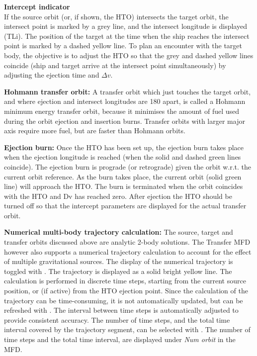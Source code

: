 \documentclass[Orbiter User Manual.tex]{subfiles}
\begin{document}
\textbf{Intercept indicator}\\
If the source orbit (or, if shown, the HTO) intersects the target orbit, the
intersect point is marked by a grey line, and the intersect longitude is
displayed (TLi). The position of the target at the time when the ship reaches
the intersect point is marked by a dashed yellow line. To plan an encounter with
the target body, the objective is to adjust the HTO so that the grey and dashed
yellow lines coincide (ship and target arrive at the intersect point
simultaneously) by adjusting the ejection time and $\Delta v$.

\textbf{Hohmann transfer orbit:}
A transfer orbit which just touches the target orbit, and where ejection and
intersect longitudes are 180\deg{} apart, is called a Hohmann minimum energy
transfer orbit, because it minimises the amount of fuel used during the orbit
ejection and insertion burns. Transfer orbits with larger major axis require
more fuel, but are faster than Hohmann orbits.

\textbf{Ejection burn:}
Once the HTO has been set up, the ejection burn takes place when the ejection
longitude is reached (when the solid and dashed green lines coincide). The
ejection burn is prograde (or retrograde) given the orbit w.r.t. the current
orbit reference. As the burn takes place, the current orbit (solid green line)
will approach the HTO. The burn is terminated when the orbit coincides with the
HTO and Dv has reached zero. After ejection the HTO should be turned off so that
the intercept parameters are displayed for the actual transfer orbit.

\textbf{Numerical multi-body trajectory calculation:}
The source, target and transfer orbits discussed above are analytic 2-body
solutions. The Transfer MFD however also supports a numerical trajectory
calculation to account for the effect of multiple gravitational sources. The
display of the numerical trajectory is toggled with . The trajectory
is displayed as a solid bright yellow line. The calculation is performed in
discrete time steps, starting from the current source position, or (if active)
from the HTO ejection point. Since the calculation of the trajectory can be
time-consuming, it is not automatically updated, but can be refreshed with
. The interval between time steps is automatically adjusted to provide
consistent accuracy. The number of time steps, and the total time interval
covered by the trajectory segment, can be selected with . The number
of time steps and the total time interval, are displayed under \emph{Num orbit}
in the MFD.
\end{document}
